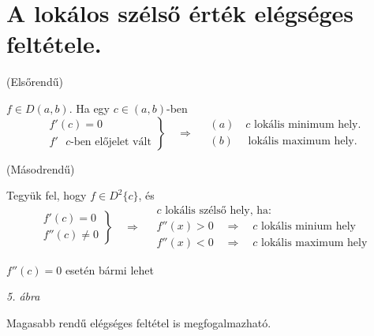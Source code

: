 \documentclass[a4paper,11.5pt]{article}
\begin{document}
	\section{A lokálos szélső érték elégséges feltétele.}
	\begin{theorem}
		(Elsőrendű)
		
		$f\in D(a,b)$. Ha egy $c\in(a,b)$-ben 
		\[ \left.\begin{gathered}
			f'(c)=0\\
			f' \text{ $c$-ben előjelet vált}
		\end{gathered}\right\}\quad \Rightarrow\quad \begin{gathered}
		(a) \quad c \text{ lokális minimum hely.}\\
		(b)\quad \text{ lokális maximum hely.}
		\end{gathered} \]
	\end{theorem}
	\begin{theorem}
		(Másodrendű)
		
		Tegyük fel, hogy $f\in D^2\{c\}$, és 
		\[\left.\begin{gathered}
			f'(c)=0\\
			f''(c)\not=0
		\end{gathered}\right\}\quad \Rightarrow\quad \begin{gathered}
			\text{$c$ lokális szélső hely, ha:}\\
			f''(x)>0\quad \Rightarrow\quad \text{$c$ lokális minium hely}\\
			f''(x)<0\quad \Rightarrow\quad \text{$c$ lokális maximum hely}
		\end{gathered} \]
	\end{theorem}
	\begin{note}
		$f''(c)=0$ esetén bármi lehet
		\begin{center}
			\textit{5. ábra}
		\end{center}
	\end{note}
	\begin{note}
		Magasabb rendű elégséges feltétel is megfogalmazható.
	\end{note}
\end{document}
